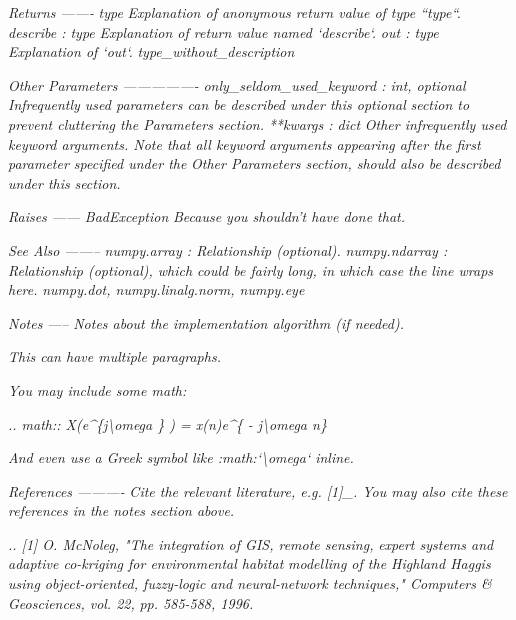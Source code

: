 \documentclass[
]{book}
\newenvironment{Shaded}{\begin{snugshade}}{\end{snugshade}}
\newcommand{\CommentTok}[1]{\textcolor[rgb]{0.56,0.35,0.01}{\textit{#1}}}
\begin{document}
\begin{itemize}
\begin{Shaded}
\begin{Highlighting}[]
\CommentTok{    Returns}
\CommentTok{    -------}
\CommentTok{    type}
\CommentTok{        Explanation of anonymous return value of type ``type``.}
\CommentTok{    describe : type}
\CommentTok{        Explanation of return value named `describe`.}
\CommentTok{    out : type}
\CommentTok{        Explanation of `out`.}
\CommentTok{    type_without_description}

\CommentTok{    Other Parameters}
\CommentTok{    ----------------}
\CommentTok{    only_seldom_used_keyword : int, optional}
\CommentTok{        Infrequently used parameters can be described under this optional}
\CommentTok{        section to prevent cluttering the Parameters section.}
\CommentTok{    **kwargs : dict}
\CommentTok{        Other infrequently used keyword arguments. Note that all keyword}
\CommentTok{        arguments appearing after the first parameter specified under the}
\CommentTok{        Other Parameters section, should also be described under this}
\CommentTok{        section.}

\CommentTok{    Raises}
\CommentTok{    ------}
\CommentTok{    BadException}
\CommentTok{        Because you shouldn't have done that.}

\CommentTok{    See Also}
\CommentTok{    --------}
\CommentTok{    numpy.array : Relationship (optional).}
\CommentTok{    numpy.ndarray : Relationship (optional), which could be fairly long, in}
\CommentTok{                    which case the line wraps here.}
\CommentTok{    numpy.dot, numpy.linalg.norm, numpy.eye}

\CommentTok{    Notes}
\CommentTok{    -----}
\CommentTok{    Notes about the implementation algorithm (if needed).}

\CommentTok{    This can have multiple paragraphs.}

\CommentTok{    You may include some math:}

\CommentTok{    .. math:: X(e^\{j\textbackslash{}omega \} ) = x(n)e^\{ - j\textbackslash{}omega n\}}

\CommentTok{    And even use a Greek symbol like :math:`\textbackslash{}omega` inline.}

\CommentTok{    References}
\CommentTok{    ----------}
\CommentTok{    Cite the relevant literature, e.g. [1]_.  You may also cite these}
\CommentTok{    references in the notes section above.}

\CommentTok{    .. [1] O. McNoleg, "The integration of GIS, remote sensing,}
\CommentTok{       expert systems and adaptive co-kriging for environmental habitat}
\CommentTok{       modelling of the Highland Haggis using object-oriented, fuzzy-logic}
\CommentTok{       and neural-network techniques," Computers & Geosciences, vol. 22,}
\CommentTok{       pp. 585-588, 1996.}


\end{Highlighting}
\end{Shaded}
\end{itemize}
\end{document}
